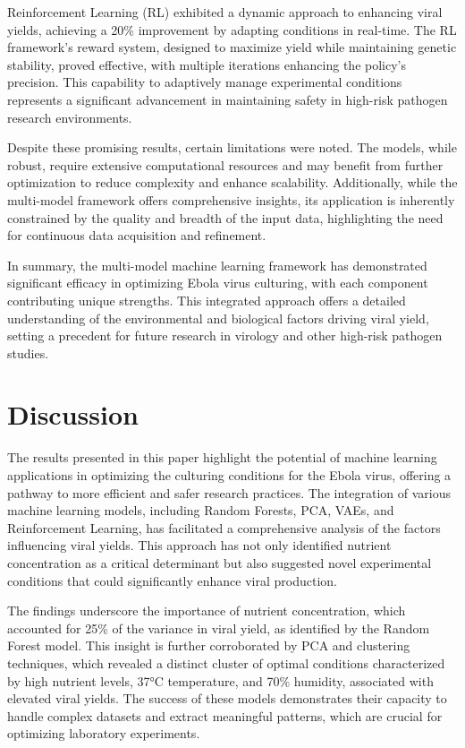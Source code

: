 \documentclass{article}
\begin{document}
Reinforcement Learning (RL) exhibited a dynamic approach to enhancing viral yields, achieving a 20\% improvement by adapting conditions in real-time. The RL framework's reward system, designed to maximize yield while maintaining genetic stability, proved effective, with multiple iterations enhancing the policy's precision. This capability to adaptively manage experimental conditions represents a significant advancement in maintaining safety in high-risk pathogen research environments.

Despite these promising results, certain limitations were noted. The models, while robust, require extensive computational resources and may benefit from further optimization to reduce complexity and enhance scalability. Additionally, while the multi-model framework offers comprehensive insights, its application is inherently constrained by the quality and breadth of the input data, highlighting the need for continuous data acquisition and refinement.

In summary, the multi-model machine learning framework has demonstrated significant efficacy in optimizing Ebola virus culturing, with each component contributing unique strengths. This integrated approach offers a detailed understanding of the environmental and biological factors driving viral yield, setting a precedent for future research in virology and other high-risk pathogen studies.

\section{Discussion}
The results presented in this paper highlight the potential of machine learning applications in optimizing the culturing conditions for the Ebola virus, offering a pathway to more efficient and safer research practices. The integration of various machine learning models, including Random Forests, PCA, VAEs, and Reinforcement Learning, has facilitated a comprehensive analysis of the factors influencing viral yields. This approach has not only identified nutrient concentration as a critical determinant but also suggested novel experimental conditions that could significantly enhance viral production.

The findings underscore the importance of nutrient concentration, which accounted for 25\% of the variance in viral yield, as identified by the Random Forest model. This insight is further corroborated by PCA and clustering techniques, which revealed a distinct cluster of optimal conditions characterized by high nutrient levels, 37°C temperature, and 70\% humidity, associated with elevated viral yields. The success of these models demonstrates their capacity to handle complex datasets and extract meaningful patterns, which are crucial for optimizing laboratory experiments.
\end{document}
